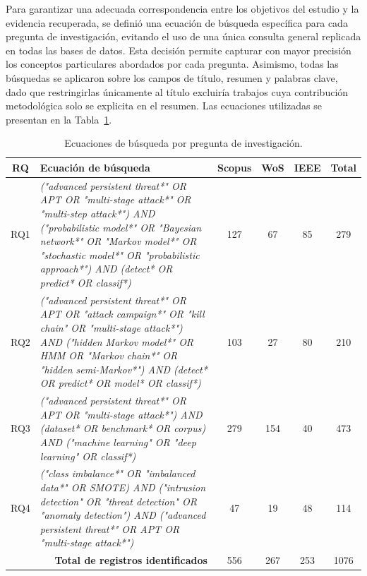 Para garantizar una adecuada correspondencia entre los objetivos del estudio y la evidencia recuperada, se definió una ecuación de búsqueda específica para cada pregunta de investigación, evitando el uso de una única consulta general replicada en todas las bases de datos. Esta decisión permite capturar con mayor precisión los conceptos particulares abordados por cada pregunta. Asimismo, todas las búsquedas se aplicaron sobre los campos de título, resumen y palabras clave, dado que restringirlas únicamente al título excluiría trabajos cuya contribución metodológica solo se explicita en el resumen. Las ecuaciones utilizadas se presentan en la Tabla~\ref{tab:ecuaciones}.

\begin{table}[h!]
\centering
\small
\caption{Ecuaciones de búsqueda por pregunta de investigación.}
\label{tab:ecuaciones}
\begin{tabular}{c p{9.4cm} c c c c}
\hline
\textbf{RQ} & \textbf{Ecuación de búsqueda} & \textbf{Scopus} & \textbf{WoS} & \textbf{IEEE} & \textbf{Total} \\
\hline
RQ1 & \textit{("advanced persistent threat*" OR APT OR "multi-stage attack*" OR "multi-step attack*") AND ("probabilistic model*" OR "Bayesian network*" OR "Markov model*" OR "stochastic model*" OR "probabilistic approach*") AND (detect* OR predict* OR classif*)} & 127 & 67 & 85 & 279 \\
\hline
RQ2 & \textit{("advanced persistent threat*" OR APT OR "attack campaign*" OR "kill chain" OR "multi-stage attack*") AND ("hidden Markov model*" OR HMM OR "Markov chain*" OR "hidden semi-Markov*") AND (detect* OR predict* OR model* OR classif*)} & 103 & 27 & 80 & 210 \\
\hline
RQ3 & \textit{("advanced persistent threat*" OR APT OR "multi-stage attack*") AND (dataset* OR benchmark* OR corpus) AND ("machine learning" OR "deep learning" OR classif*)} & 279 & 154 & 40 & 473 \\
\hline
RQ4 & \textit{("class imbalance*" OR "imbalanced data*" OR SMOTE) AND ("intrusion detection" OR "threat detection" OR "anomaly detection") AND ("advanced persistent threat*" OR APT OR "multi-stage attack*")} & 47 & 19 & 48 & 114 \\
\hline
\multicolumn{2}{r}{\textbf{Total de registros identificados}} & 556 & 267 & 253 & 1076 \\
\hline
\end{tabular}

\vspace{2mm}


\end{table}
